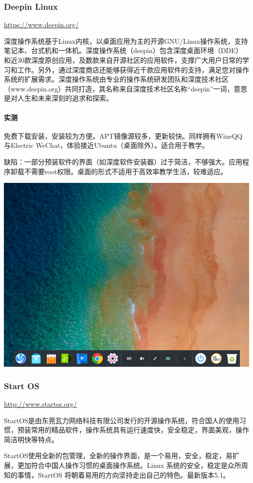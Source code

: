 \subsubsection{Deepin Linux}
\url{https://www.deepin.org/}\par
\cite{deepininfo}深度操作系统基于Linux内核，以桌面应用为主的开源GNU/Linux操作系统，支持笔记本、台式机和一体机。深度操作系统（deepin）包含深度桌面环境（DDE）和近30款深度原创应用，及数款来自开源社区的应用软件，支撑广大用户日常的学习和工作。另外，通过深度商店还能够获得近千款应用软件的支持，满足您对操作系统的扩展需求。深度操作系统由专业的操作系统研发团队和深度技术社区（www.deepin.org）共同打造，其名称来自深度技术社区名称“deepin”一词，意思是对人生和未来深刻的追求和探索。
\paragraph{实测}
免费下载安装，安装较为方便。APT镜像源较多，更新较快。同样拥有WineQQ与Electric WeChat，体验接近Ubuntu（桌面除外）。适合用于教学。\par
缺陷：一部分预装软件的界面（如深度软件安装器）过于简洁，不够强大。应用程序卸载不需要root权限。桌面的形式不适用于高效率教学生活，较难适应。
\begin{center}
	\includegraphics[scale=0.5]{pic/deepin}
\end{center} \par
\subsubsection{Start OS}
\url{http://www.startos.org/}\par
\cite{startosinfo} StartOS是由东莞瓦力网络科技有限公司发行的开源操作系统，符合国人的使用习惯，预装常用的精品软件，操作系统具有运行速度快，安全稳定，界面美观，操作简洁明快等特点。\par
StartOS使用全新的包管理，全新的操作界面，是一个易用，安全，稳定，易扩展，更加符合中国人操作习惯的桌面操作系统。Linux 系统的安全，稳定是众所周知的事情，StartOS 将朝着易用的方向坚持走出自己的特色。最新版本5.1。\par
